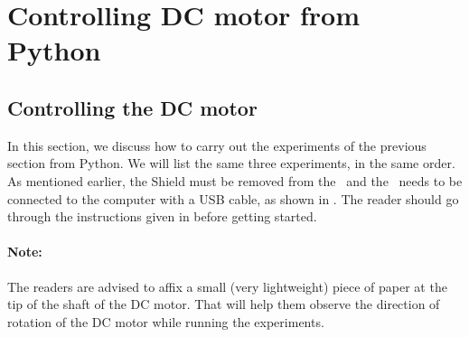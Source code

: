 \section{Controlling DC motor from Python}
\subsection{Controlling the DC motor}
In this section, we discuss how to carry out the experiments of the
previous section from Python.  We will list the same three experiments,
in the same order. As mentioned earlier, the Shield must be removed from
the \arduino\ and the \arduino\ needs to be connected to the computer
with a USB cable, as shown in . The reader should go through the instructions given in
 before getting started.

\paragraph{Note:} The readers are advised to affix a small
(very lightweight) piece of paper at the tip of the shaft of the DC motor.
That will help them observe the direction of rotation
of the DC motor while running the experiments.

